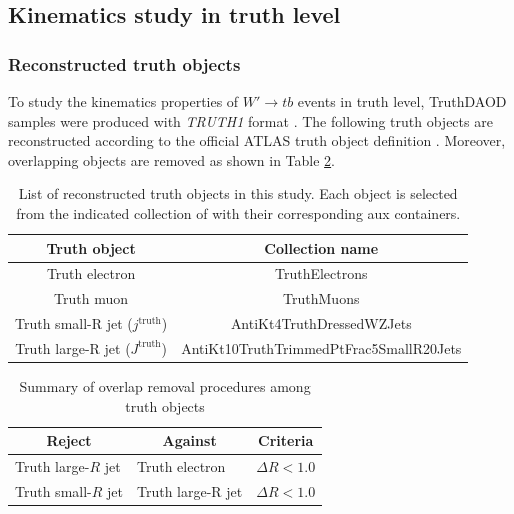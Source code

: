 \subsection{Kinematics study in truth level}
\label{subsec:WprimeKinematicsStudyInTruthLevel}

\subsubsection{Reconstructed truth objects}
To study the kinematics properties of $W'{\rightarrow}tb$ events in truth level, TruthDAOD samples were produced with \textit{TRUTH1} format \cite{Twiki-TruthDAOD}. The following truth objects are reconstructed according to the official ATLAS truth object definition \cite{ATL-COM-PHYS-2014-439}. Moreover, overlapping objects are removed as shown in Table \ref{tab:TRUTHOLR}. 

\begin{table}[H]
  \centering
  \begin{tabular*}{110mm}{@{\extracolsep{\fill}}cc}
    \hline\hline
    Truth object                           & Collection name\\
    \hline
    Truth electron                         & TruthElectrons\\
    Truth muon                             & TruthMuons\\
    Truth small-R jet ($j^{\text{truth}}$) & AntiKt4TruthDressedWZJets\\
    Truth large-R jet ($J^{\text{truth}}$) & AntiKt10TruthTrimmedPtFrac5SmallR20Jets\\
    \hline\hline
  \end{tabular*}
  \caption{List of reconstructed truth objects in this study. Each object is selected from the indicated collection of with their corresponding aux containers.}
  \label{tab:TruthObjects}
\end{table}

\begin{table}[H]
  \centering
  \begin{tabular*}{100mm}{lll}
    \hline\hline
    \multicolumn{1}{c}{Reject} & \multicolumn{1}{c}{Against}  & \multicolumn{1}{c}{Criteria}\\
    \hline
    Truth large-$R$ jet        & Truth electron               & ${\Delta}R<1.0$\\
    Truth small-$R$ jet        & Truth large-R jet            & ${\Delta}R<1.0$\\
    \hline\hline
  \end{tabular*}
  \caption{Summary of overlap removal procedures among truth objects}
  \label{tab:TRUTHOLR}
\end{table}


